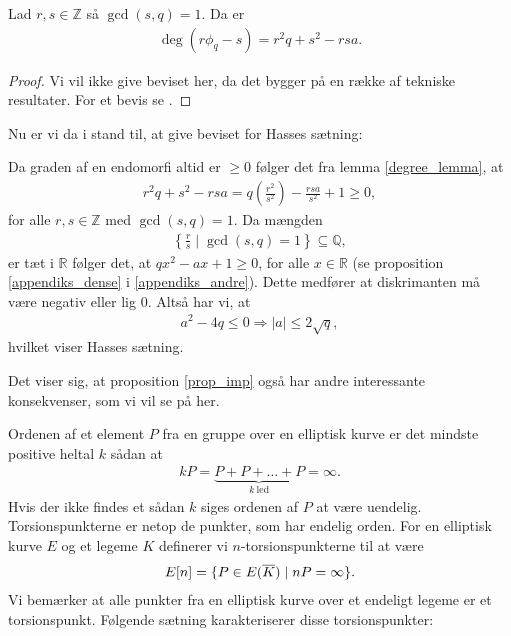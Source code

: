 \begin{lemma}
\label{degree_lemma}
Lad $r, s \in \mathbb{Z}$ så $\gcd(s, q) = 1$. Da er 
\begin{align*}
	\deg(r \phi_q - s) = r^2 q + s^2 - rsa.
\end{align*}
\end{lemma}
\begin{proof}
Vi vil ikke give beviset her, da det bygger på en række af tekniske resultater. For et bevis se \cite[s.~100]{Washington}.
\end{proof}
Nu er vi da i stand til, at give beviset for Hasses sætning:

\begin{proofof}
Da graden af en endomorfi altid er $\geq 0$ følger det fra lemma \ref{degree_lemma}, at 
\begin{align*}
	r^2q+s^2 -rsa = q \left( \frac{r^2}{s^2} \right) - \frac{rsa}{s^2} + 1 
	\geq 0,
\end{align*}
for alle $r, s \in \mathbb{Z}$ med $\gcd(s, q)=1$. Da mængden
\begin{align*}
	\left\{ \frac{r}{s} \mid \gcd(s, q)=1 \right\} \subseteq \mathbb{Q},
\end{align*}
er tæt i $\mathbb{R}$ følger det, at $qx^2 - ax + 1 \geq 0$,
for alle $x \in \mathbb{R}$ (se proposition \ref{appendiks_dense} i \ref{appendiks_andre}). Dette medfører at diskrimanten må være negativ eller lig $0$.
Altså har vi, at 
\begin{align*}
	a^2 - 4q \leq 0 \Rightarrow |a| \leq 2 \sqrt{q},
\end{align*}
hvilket viser Hasses sætning.
\end{proofof}
Det viser sig, at proposition \ref{prop_imp} også har andre interessante konsekvenser, som vi vil se på her. 

Ordenen af et element $P$ fra en gruppe over en elliptisk kurve er det mindste positive heltal $k$ sådan at 
\begin{align*}
	kP = \underbrace{P + P + \ldots + P}_{k \ \text{led}} = \infty.
\end{align*}
Hvis der ikke findes et sådan $k$ siges ordenen af $P$ at være uendelig. Torsionspunkterne er netop de punkter, som har endelig orden. For en elliptisk kurve $E$ og et legeme $K$ definerer vi $n$-torsionspunkterne til at være
\begin{align*}
	E[n] = \{ P \in E(\overline{K}) \mid nP= \infty \}.
\end{align*}
Vi bemærker at alle punkter fra en elliptisk kurve over et endeligt legeme er et torsionspunkt. Følgende sætning karakteriserer disse torsionspunkter:

